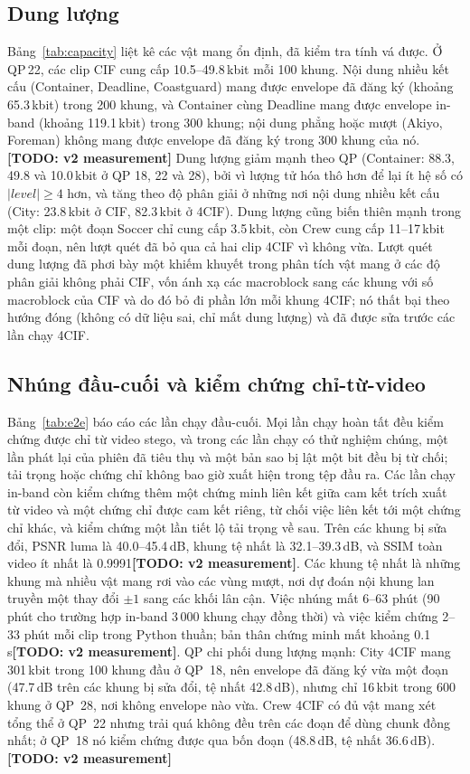 \documentclass[journal]{IEEEtran}
\newcommand{\todo}[1]{\textbf{[TODO: #1]}}
\begin{document}
\subsection{Dung lượng}
Bảng~\ref{tab:capacity} liệt kê các vật mang ổn định, đã kiểm tra tính vá được.
Ở QP\,22, các clip CIF cung cấp 10.5--49.8\,kbit mỗi 100 khung. Nội dung nhiều
kết cấu (Container, Deadline, Coastguard) mang được envelope đã đăng ký (khoảng
65.3\,kbit) trong 200 khung, và Container cùng Deadline mang được envelope
in-band (khoảng 119.1\,kbit) trong 300 khung; nội dung phẳng hoặc mượt (Akiyo,
Foreman) không mang được envelope đã đăng ký trong 300 khung của nó.\todo{v2 measurement}
Dung lượng giảm mạnh theo QP (Container: 88.3, 49.8 và 10.0\,kbit ở QP 18, 22
và 28), bởi vì lượng tử hóa thô hơn để lại ít hệ số có $|\mathit{level}|\ge4$
hơn, và tăng theo độ phân giải ở những nơi nội dung nhiều kết cấu (City:
23.8\,kbit ở CIF, 82.3\,kbit ở 4CIF). Dung lượng cũng biến thiên mạnh trong một
clip: một đoạn Soccer chỉ cung cấp 3.5\,kbit, còn Crew cung cấp 11--17\,kbit mỗi
đoạn, nên lượt quét đã bỏ qua cả hai clip 4CIF vì không vừa. Lượt quét dung
lượng đã phơi bày một khiếm khuyết trong phân tích vật mang ở các độ phân giải
không phải CIF, vốn ánh xạ các macroblock sang các khung với số macroblock của
CIF và do đó bỏ đi phần lớn mỗi khung 4CIF; nó thất bại theo hướng đóng (không
có dữ liệu sai, chỉ mất dung lượng) và đã được sửa trước các lần chạy 4CIF.



\subsection{Nhúng đầu-cuối và kiểm chứng chỉ-từ-video}
Bảng~\ref{tab:e2e} báo cáo các lần chạy đầu-cuối. Mọi lần chạy hoàn tất đều kiểm
chứng được chỉ từ video stego, và trong các lần chạy có thử nghiệm chúng, một
lần phát lại của phiên đã tiêu thụ và một bản sao bị lật một bit đều bị từ chối;
tải trọng hoặc chứng chỉ không bao giờ xuất hiện trong tệp đầu ra. Các lần chạy
in-band còn kiểm chứng thêm một chứng minh liên kết giữa cam kết trích xuất từ
video và một chứng chỉ được cam kết riêng, từ chối việc liên kết tới một chứng
chỉ khác, và kiểm chứng một lần tiết lộ tải trọng về sau. Trên các khung bị sửa
đổi, PSNR luma là 40.0--45.4\,dB, khung tệ nhất là 32.1--39.3\,dB, và SSIM toàn
video ít nhất là 0.9991\todo{v2 measurement}. Các khung tệ nhất là những khung mà nhiều vật mang
rơi vào các vùng mượt, nơi dự đoán nội khung lan truyền một thay đổi $\pm1$ sang
các khối lân cận. Việc nhúng mất 6--63 phút (90 phút cho trường hợp in-band
3\,000 khung chạy đồng thời) và việc kiểm chứng 2--33 phút mỗi clip trong Python
thuần; bản thân chứng minh mất khoảng 0.1\,s\todo{v2 measurement}. QP chi phối dung lượng mạnh:
City 4CIF mang 301\,kbit trong 100 khung đầu ở QP~18, nên envelope đã đăng ký
vừa một đoạn (47.7\,dB trên các khung bị sửa đổi, tệ nhất 42.8\,dB), nhưng chỉ
16\,kbit trong 600 khung ở QP~28, nơi không envelope nào vừa. Crew 4CIF có đủ
vật mang xét tổng thể ở QP~22 nhưng trải quá không đều trên các đoạn để dùng
chunk đồng nhất; ở QP~18 nó kiểm chứng được qua bốn đoạn (48.8\,dB, tệ nhất
36.6\,dB).\todo{v2 measurement}
\end{document}
